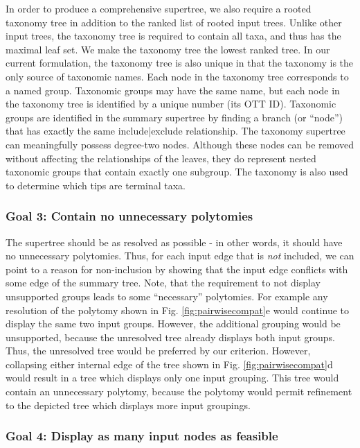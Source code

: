 \documentclass[fleqn,12pt,lineno,english]{wlpeerj}
\begin{document}
In order to produce a comprehensive supertree, we also require a rooted
taxonomy tree in addition to the ranked list of rooted input trees.
Unlike other input trees, the taxonomy tree is required to contain
all taxa, and thus has the maximal leaf set. We make the taxonomy
tree the lowest ranked tree. In our current formulation, the taxonomy
tree is also unique in that the taxonomy is the only source of taxonomic
names. Each node in the taxonomy tree corresponds to a named group.
Taxonomic groups may have the same name, but each node in the taxonomy
tree is identified by a unique number (its OTT ID). Taxonomic groups
are identified in the summary supertree by finding a branch (or ``node'')
that has exactly the same include|exclude relationship. The taxonomy
supertree can meaningfully possess degree-two nodes. Although these
nodes can be removed without affecting the relationships of the leaves,
they do represent nested taxonomic groups that contain exactly one
subgroup. The taxonomy is also used to determine which tips are terminal
taxa.

\subsubsection{Goal 3: Contain no unnecessary polytomies}

The supertree should be as resolved as possible - in other words,
it should have no unnecessary polytomies. Thus, for each input edge
that is \emph{not} included, we can point to a reason for non-inclusion
by showing that the input edge conflicts with some edge of the summary
tree. Note, that the requirement to not display unsupported groups
leads to some ``necessary'' polytomies. For example any resolution
of the polytomy shown in Fig. \ref{fig:pairwisecompat}e would
continue to display the same two input groups. However, the additional
grouping would be unsupported, because the unresolved tree already
displays both input groups. Thus, the 
unresolved tree would be preferred by our criterion.
However, collapsing either internal edge of the tree shown in Fig.
\ref{fig:pairwisecompat}d would result in a tree which displays
only one input grouping. This tree would contain an unnecessary polytomy,
because the polytomy would permit refinement to the depicted tree
which displays more input groupings.

\subsubsection{Goal 4: Display as many input nodes as feasible}
\end{document}
